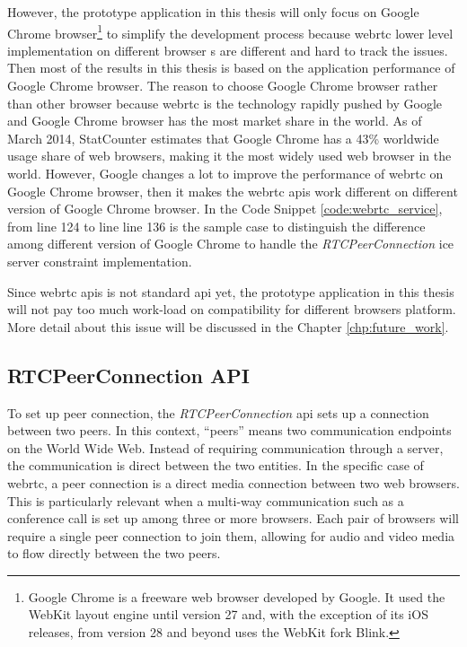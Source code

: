 \par However, the prototype application in this thesis will only focus on Google Chrome browser\footnote{Google Chrome is a freeware web browser developed by Google. It used the WebKit layout engine until version 27 and, with the exception of its iOS releases, from version 28 and beyond uses the WebKit fork Blink.\cite{wiki:google_chrome}} to simplify the development process because \gls{webrtc} lower level implementation on different browser s are different and hard to track the issues. Then most of the results in this thesis is based on the application performance of Google Chrome browser. The reason to choose Google Chrome browser rather than other browser because \gls{webrtc} is the technology rapidly pushed by Google and Google Chrome browser has the most market share in the world. As of March 2014, StatCounter estimates that Google Chrome has a 43\% worldwide usage share of web browsers, making it the most widely used web browser in the world.\cite{wiki:google_chrome} However, Google changes a lot to improve the performance of \gls{webrtc} on Google Chrome browser, then it makes the \gls{webrtc} \gls{api}s work different on different version of Google Chrome browser. In the Code Snippet \ref{code:webrtc_service}, from line 124 to line line 136 is the sample case to distinguish the difference among different version of Google Chrome to handle the \textit{RTCPeerConnection} \gls{ice} server constraint implementation.

\par Since \gls{webrtc} \gls{api}s is not standard \gls{api} yet, the prototype application in this thesis will not pay too much work-load on compatibility for different browsers platform. More detail about this issue will be discussed in the Chapter \ref{chp:future_work}.

\subsection{RTCPeerConnection API}

\noindent To set up peer connection, the \textit{RTCPeerConnection} \gls{api} sets up a connection between two peers. In this context, “peers” means two communication endpoints on the World Wide Web. Instead of requiring communication through a server, the communication is direct between the two entities. In the specific case of \gls{webrtc}, a peer connection is a direct media connection between two web browsers. This is particularly relevant when a multi-way communication such as a conference call is set up among three or more browsers. Each pair of browsers will require a single peer connection to join them, allowing for audio and video media to flow directly between the two peers. 

